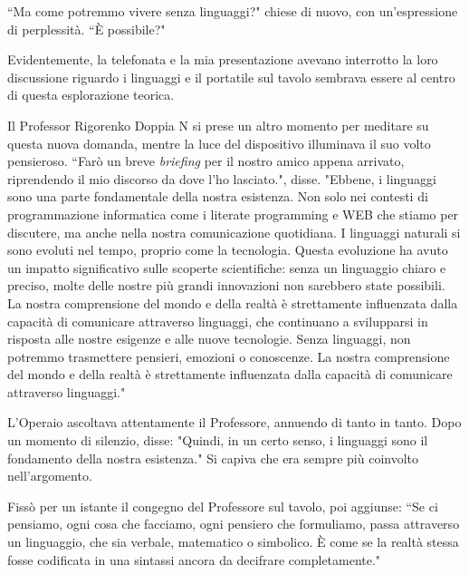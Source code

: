 \documentclass[12pt,b5paper]{article}
\begin{document}
``Ma come potremmo vivere senza linguaggi?" chiese di nuovo, con un'espressione
di perplessità. ``È possibile?"

Evidentemente, la telefonata e la mia presentazione avevano interrotto la
loro discussione riguardo i linguaggi e il portatile sul tavolo sembrava essere
al centro di questa esplorazione teorica.

Il Professor Rigorenko Doppia N si prese un altro momento per meditare su
questa nuova domanda, mentre la luce del dispositivo illuminava il suo volto pensieroso. ``Farò un breve
\textit{briefing} per il nostro amico appena arrivato, riprendendo il mio discorso
da dove l'ho lasciato.", disse. "Ebbene, i linguaggi sono una parte fondamentale
della nostra esistenza. Non solo nei contesti di programmazione informatica come i
literate programming e WEB che stiamo per discutere, ma anche nella nostra comunicazione quotidiana. I linguaggi naturali si sono evoluti nel tempo, proprio
come la tecnologia. Questa evoluzione ha avuto un impatto significativo sulle
scoperte scientifiche: senza un linguaggio chiaro e preciso, molte delle nostre più
grandi innovazioni non sarebbero state possibili. La nostra comprensione del mondo e
della realtà è strettamente influenzata dalla capacità di comunicare attraverso
linguaggi, che continuano a svilupparsi in risposta alle nostre esigenze e alle
nuove tecnologie. Senza linguaggi, non potremmo trasmettere pensieri, emozioni o
conoscenze. La nostra comprensione del mondo e della realtà è strettamente
influenzata dalla capacità di comunicare attraverso linguaggi."

L'Operaio ascoltava attentamente il Professore, annuendo di tanto in tanto.
Dopo un momento di silenzio, disse: "Quindi, in un certo senso, i linguaggi
sono il fondamento della nostra esistenza." Si capiva che era sempre più
coinvolto nell'argomento.

Fissò per un istante il congegno del Professore sul tavolo, poi aggiunse: ``Se ci
pensiamo, ogni cosa che facciamo, ogni pensiero che formuliamo, passa attraverso
un linguaggio, che sia verbale, matematico o simbolico. È come se la realtà
stessa fosse codificata in una sintassi ancora da decifrare completamente."
\end{document}
